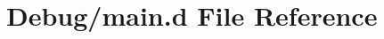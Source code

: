 \hypertarget{_debug_2main_8d}{\section{Debug/main.d File Reference}
\label{db/d2e/_debug_2main_8d}
}
